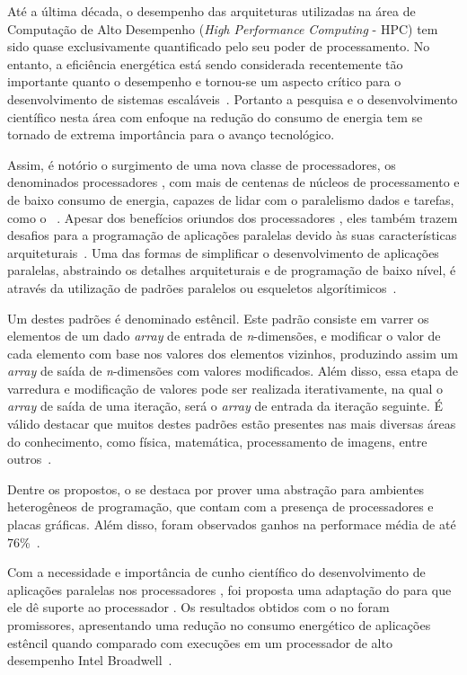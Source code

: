 Até a última década, o desempenho das arquiteturas utilizadas na área de Computação de Alto Desempenho (\textit{High Performance Computing} - HPC) tem sido quase exclusivamente quantificado pelo seu poder de processamento. No entanto, a eficiência energética está sendo considerada recentemente tão importante quanto o desempenho e tornou-se um aspecto crítico para o desenvolvimento de sistemas escaláveis~\cite{francesquini:hal-01092325}. Portanto a pesquisa e o desenvolvimento científico nesta área com enfoque na redução do consumo de energia tem se tornado de extrema importância para o avanço tecnológico.

Assim, é notório o surgimento de uma nova classe de processadores, os denominados processadores \manycore, com mais de centenas de núcleos de processamento e de baixo consumo de energia, capazes de lidar com o paralelismo dados e tarefas, como o \mppa~\cite{castro2013}. 
Apesar dos benefícios oriundos dos processadores \manycore, eles também trazem desafios para a programação de aplicações paralelas devido às suas características arquiteturais~\cite{castro:hal-01273153}. Uma das formas de simplificar o desenvolvimento de aplicações paralelas, abstraindo os detalhes arquiteturais e de programação de baixo nível, é através da utilização de padrões paralelos ou esqueletos algorítimicos~\cite{COLE2004389}.

Um destes padrões é denominado estêncil. Este padrão consiste em varrer os elementos de um dado \textit{array} de entrada de \textit{n}-dimensões, e modificar o valor de cada elemento com base nos valores dos elementos vizinhos, produzindo assim um \textit{array} de saída de \textit{n}-dimensões com valores modificados. Além disso, essa etapa de varredura e modificação de valores pode ser realizada iterativamente, na qual o \textit{array} de saída de uma iteração, será o \textit{array} de entrada da iteração seguinte. É válido destacar que muitos destes padrões estão presentes nas mais diversas áreas do conhecimento, como física, matemática, processamento de imagens, entre outros~\cite{Holewinski:2012:HCG:2304576.2304619}.

Dentre os \fws propostos, o \pskel se destaca por prover uma abstração para ambientes heterogêneos de programação, que contam com a presença de processadores \multicore e placas gráficas. Além disso, foram observados ganhos na performace média de até 76\%~\cite{CPE:CPE3479}.

Com a necessidade e importância de cunho científico do desenvolvimento de aplicações paralelas nos processadores \manycore, foi proposta uma adaptação do \fw \pskel para que ele dê suporte ao processador \mppa. Os resultados obtidos com o \pskel no \mppa foram promissores, apresentando uma redução no consumo energético de aplicações estêncil quando comparado  com execuções em um processador de alto desempenho Intel Broadwell~\cite{wscad2017}.

